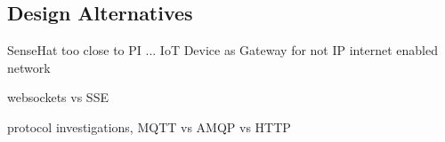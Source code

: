 \subsection{Design Alternatives}

SenseHat too close to PI ... IoT Device as Gateway for not IP internet enabled network

websockets vs SSE

protocol investigations, MQTT vs AMQP vs HTTP